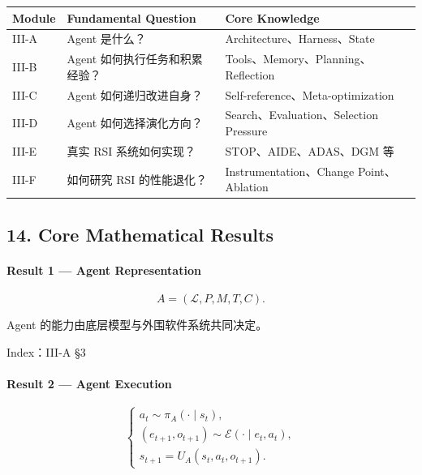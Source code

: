\begin{readertable}
\begin{longtable}[]{@{}
  >{\raggedright\arraybackslash}p{}
  >{\raggedright\arraybackslash}p{}
  >{\raggedright\arraybackslash}p{}@{}}
\toprule
Module & Fundamental Question & Core Knowledge \\
\midrule
\endhead
III-A & Agent 是什么？ & Architecture、Harness、State \\
III-B & Agent 如何执行任务和积累经验？ & Tools、Memory、Planning、Reflection \\
III-C & Agent 如何递归改进自身？ & Self-reference、Meta-optimization \\
III-D & Agent 如何选择演化方向？ & Search、Evaluation、Selection Pressure \\
III-E & 真实 RSI 系统如何实现？ & STOP、AIDE、ADAS、DGM 等 \\
III-F & 如何研究 RSI 的性能退化？ & Instrumentation、Change Point、Ablation \\
\bottomrule
\end{longtable}
\end{readertable}

\hypertarget{part-3-48-0001-core-mathematical-results}{%
\subsection{14. Core Mathematical Results}\label{part-3-48-0001-core-mathematical-results}}

\hypertarget{part-3-48-0001-result-1-agent-representation}{%
\paragraph{Result 1 --- Agent Representation}\label{part-3-48-0001-result-1-agent-representation}}

\[A=(\mathcal L,P,M,T,C).\]

Agent 的能力由底层模型与外围软件系统共同决定。

Index：III-A §3

\hypertarget{part-3-48-0001-result-2-agent-execution}{%
\paragraph{Result 2 --- Agent Execution}\label{part-3-48-0001-result-2-agent-execution}}

\[\begin{cases}
a_t\sim\pi_A(\cdot\mid s_t),\\
(e_{t+1},o_{t+1})
\sim\mathcal E(\cdot\mid e_t,a_t),\\
s_{t+1}=U_A(s_t,a_t,o_{t+1}).
\end{cases}\]


